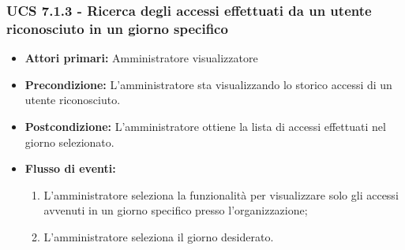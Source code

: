 \subsubsection{UCS 7.1.3 - Ricerca degli accessi effettuati da un utente riconosciuto in un giorno specifico}
\begin{itemize}
	\item \textbf{Attori primari:} Amministratore visualizzatore
	\item \textbf{Precondizione:} L'amministratore sta visualizzando lo storico accessi di un utente riconosciuto.
	\item \textbf{Postcondizione:} L'amministratore ottiene la lista di accessi effettuati nel giorno selezionato.
	\item \textbf{Flusso di eventi:}
	\begin{enumerate}
		\item L'amministratore seleziona la funzionalità per visualizzare solo gli accessi avvenuti in un giorno specifico presso l'organizzazione;
		\item L'amministratore seleziona il giorno desiderato.
	\end{enumerate}  
\end{itemize}


